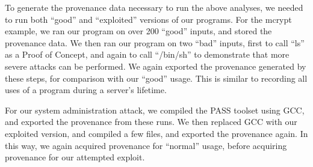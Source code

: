 \documentclass[10pt,twocolumn]{article}
\begin{document}
To generate the provenance data necessary to run the above analyses, we needed to run both “good” and “exploited” versions of our programs. For the mcrypt example, we ran our program on over 200 “good” inputs, and stored the provenance data. We then ran our program on two “bad” inputs, first to call “ls” as a Proof of Concept, and again to call “/bin/sh” to demonstrate that more severe attacks can be performed. We again exported the provenance generated by these steps, for comparison with our “good” usage. This is similar to recording all uses of a program during a server’s lifetime. 

For our system administration attack, we compiled the PASS toolset using GCC, and exported the provenance from these runs. We then replaced GCC with our exploited version, and compiled a few files, and exported the provenance again. In this way, we again acquired provenance for “normal” usage, before acquiring provenance for our attempted exploit. 
\end{document}
